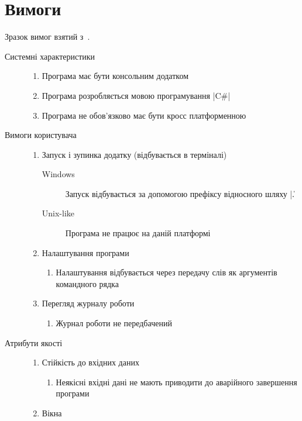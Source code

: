 \section{Вимоги}
Зразок вимог взятий з~\cite{kulikov}. 
\begin{description}
	\item[Системні характеристики]\directenv%
		\begin{enumerate}
			\item Програма має бути консольним додатком
			\item Програма розробляється мовою програмування \textinline|C#| 
			\item Програма не обов'язково має бути кросс платформенною
		\end{enumerate}
	\item[Вимоги користувача]\directenv%
		\begin{enumerate}
			\item Запуск і зупинка додатку (відбувається в терміналі)
				\begin{description}
					\item[Windows]
						Запуск відбувається за допомогою префіксу відносного шляху \textinline|.\|
					\item[Unix-like]
						Програма не працює на даній платформі
				\end{description}
			\item Налаштування програми
				\begin{enumerate}
					\item Налаштування відбувається через передачу слів як аргументів командного рядка
				\end{enumerate}
			\item Перегляд журналу роботи
				\begin{enumerate}
					\item Журнал роботи не передбачений
				\end{enumerate}
		\end{enumerate}
	\item[Атрибути якості]\directenv%
		\begin{enumerate}
			\item Стійкість до вхідних даних
				\begin{enumerate}
					\item Неякісні вхідні дані не мають приводити до аварійного завершення програми
				\end{enumerate}
			\item Вікна
				\begin{enumerate}

\end{enumerate}
\end{enumerate}
\end{description}
